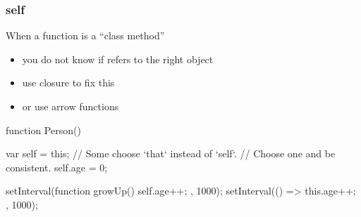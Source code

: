 \begin{frame}[fragile] \frametitle{self}
When a function is a ``class method''
\begin{itemize}
  \item you do not know if  refers to the right object
  \item use closure to fix this
  \item or use arrow functions
\end{itemize}
\begin{CodeBox}{}
function Person() {
  var self = this; // Some choose `that` instead of `self`. 
                   // Choose one and be consistent.
  self.age = 0;

  setInterval(function growUp() { self.age++; }, 1000);
  setInterval(() => { this.age++;  }, 1000);
}
\end{CodeBox}
\end{frame}
